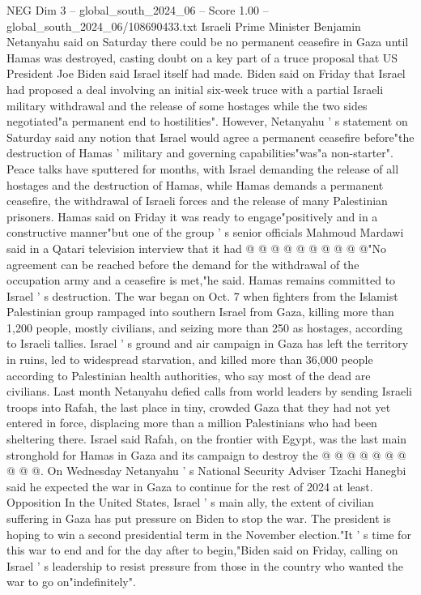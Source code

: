 \begin{textsample}{NEG Dim 3 – global\_south\_2024\_06 – Score 1.00 – global\_south\_2024\_06/108690433.txt}  \label{ex:f3_neg_113}
Israeli Prime Minister Benjamin Netanyahu said on Saturday there could be no permanent ceasefire in Gaza until Hamas was destroyed, casting doubt on a key part of a truce proposal that US President Joe Biden said Israel itself had made.
Biden said on Friday that Israel had proposed a deal involving an initial six-week truce with a partial Israeli military withdrawal and the release of some hostages while the two sides negotiated"a permanent end to hostilities".
However, Netanyahu ' s statement on Saturday said any notion that Israel would agree a permanent ceasefire before"the destruction of Hamas ' military and governing capabilities"was"a non-starter".
Peace talks have sputtered for months, with Israel demanding the release of all hostages and the destruction of Hamas, while Hamas demands a permanent ceasefire, the withdrawal of Israeli forces and the release of many Palestinian prisoners.
Hamas said on Friday it was ready to engage"positively and in a constructive manner"but one of the group ' s senior officials Mahmoud Mardawi said in a Qatari television interview that it had @ @ @ @ @ @ @ @ @ @"No agreement can be reached before the demand for the withdrawal of the occupation army and a ceasefire is met,"he said.
Hamas remains committed to Israel ' s destruction.
The war began on Oct. 7 when fighters from the Islamist Palestinian group rampaged into southern Israel from Gaza, killing more than 1,200 people, mostly civilians, and seizing more than 250 as hostages, according to Israeli tallies.
Israel ' s ground and air campaign in Gaza has left the territory in ruins, led to widespread starvation, and killed more than 36,000 people according to Palestinian health authorities, who say most of the dead are civilians.
Last month Netanyahu defied calls from world leaders by sending Israeli troops into Rafah, the last place in tiny, crowded Gaza that they had not yet entered in force, displacing more than a million Palestinians who had been sheltering there.
Israel said Rafah, on the frontier with Egypt, was the last main stronghold for Hamas in Gaza and its campaign to destroy the @ @ @ @ @ @ @ @ @ @.
On Wednesday Netanyahu ' s National Security Adviser Tzachi Hanegbi said he expected the war in Gaza to continue for the rest of 2024 at least.
Opposition In the United States, Israel ' s main ally, the extent of civilian suffering in Gaza has put pressure on Biden to stop the war.
The president is hoping to win a second presidential term in the November election."It ' s time for this war to end and for the day after to begin,"Biden said on Friday, calling on Israel ' s leadership to resist pressure from those in the country who wanted the war to go on"indefinitely".

\end{textsample}
